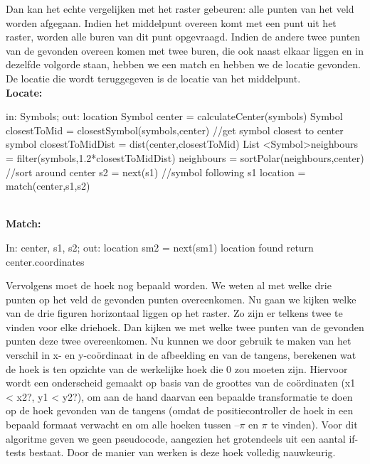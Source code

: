 \documentclass[eind]{penoverslag}
\begin{document}
Dan kan het echte vergelijken met het raster gebeuren: alle punten van het veld worden afgegaan. Indien het middelpunt overeen komt met een punt uit het raster, worden alle buren van dit punt opgevraagd. Indien de andere twee punten van de gevonden overeen komen met twee buren, die ook naast elkaar liggen en in dezelfde volgorde staan, hebben we een match en hebben we de locatie gevonden. De locatie die wordt teruggegeven is de locatie van het middelpunt.\\

\textbf{Locate: }
\begin{algorithmic}

	\STATE in: Symbols; out: location
	\STATE Symbol center = calculateCenter(symbols)
	\STATE Symbol closestToMid = closestSymbol(symbols,center)     //get symbol closest to center symbol
	\STATE closestToMidDist = dist(center,closestToMid)
	\STATE List \textless Symbol\textgreater neighbours = filter(symbols,1.2*closestToMidDist)
	\STATE neighbours = sortPolar(neighbours,center)     //sort around center
		\STATE s2 = next(s1) //symbol following s1
			\STATE location = match(center,s1,s2)
		\ENDIF
	\ENDFOR
	
\end{algorithmic}
~\\
\textbf{Match:}
\begin{algorithmic}
\STATE In: center, s1, s2; out: location
				\STATE sm2 = next(sm1)
					\STATE location found
					\STATE return center.coordinates
				\ENDIF
			\ENDFOR
		\ENDIF
	\ENDFOR
\end{algorithmic}

Vervolgens moet de hoek nog bepaald worden. We weten al met welke drie punten op het veld de gevonden punten overeenkomen. Nu gaan we kijken welke van de drie figuren horizontaal liggen op het raster. Zo zijn er telkens twee te vinden voor elke driehoek. Dan kijken we met welke twee punten van de gevonden punten deze twee overeenkomen. Nu kunnen we door gebruik te maken van het verschil in x- en y-co\"{o}rdinaat in de afbeelding en van de tangens, berekenen wat de hoek is ten opzichte van de werkelijke hoek die 0 zou moeten zijn.
Hiervoor wordt een onderscheid gemaakt op basis van de groottes van de coördinaten (x1 < x2?, y1 < y2?), om aan de hand daarvan een bepaalde transformatie te doen op de hoek gevonden van de tangens (omdat de positiecontroller de hoek in een bepaald formaat verwacht en om alle hoeken tussen $–\pi$ en $\pi$ te vinden). Voor dit algoritme geven we geen pseudocode, aangezien het grotendeels uit een aantal if-tests bestaat. Door de manier van werken is deze hoek volledig nauwkeurig.
\end{document}
